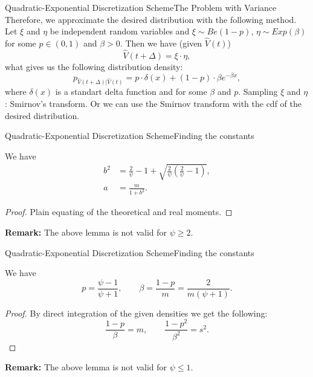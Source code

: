     \begin{frame}{Quadratic-Exponential Discretization Scheme}{The Problem with Variance}
        Therefore, we approximate the desired distribution with the following method. Let $\xi$ and $\eta$ be independent random variables and  $\xi \sim Be(1-p)$, $\eta \sim Exp(\beta)$ for some $p \in (0, 1)$ and $\beta > 0$. Then we have (given $\hat{V}(t)$)
        \begin{equation}
            \hat{V}(t+\Delta) = \xi\cdot\eta,
        \end{equation}
        what gives us the following distribution density:
        \begin{equation}
            p_{\hat{V}(t+\Delta)\vert \hat{V}(t)} = p\cdot \delta(x) + (1-p) \cdot\beta e^{-\beta x},
        \end{equation}
        where $\delta(x)$ is a standart delta function and for some $\beta$ and $p$.
        Sampling $\xi$ and $\eta$: Smirnov's transform. Or we can use the Smirnov transform with the cdf of the desired distribution.
    \end{frame}

    \begin{frame}{Quadratic-Exponential Discretization Scheme}{Finding the constants}
        \begin{lemma}
            We have
            \begin{align}
                b^2 &= \frac{2}{\psi} -1 +\sqrt{\frac{2}{\psi}\left(\frac{2}{\psi}-1\right)}, \\ 
                a   &= \frac{m}{1+b^2}.
            \end{align}
        \end{lemma}
        \begin{proof}
            Plain equating of the theoretical and real moments.
        \end{proof}
        \textbf{Remark:} The above lemma is not valid for $\psi \geq 2$.
    \end{frame}

    \begin{frame}{Quadratic-Exponential Discretization Scheme}{Finding the constants}
        \begin{lemma}
            We have
            \begin{equation}
                p     = \frac{\psi - 1}{\psi + 1}, \qquad \beta = \frac{1-p}{m} = \frac{2}{m(\psi+1)}.
            \end{equation}
        \end{lemma}
        \begin{proof}
            By direct integration of the given densities we get the following:
            \begin{equation}
                \frac{1-p}{\beta} = m, \qquad \frac{1-p^2}{\beta^2} = s^2.
            \end{equation}
        \end{proof}
        \textbf{Remark:} The above lemma is not valid for $\psi \leq 1$.
    \end{frame}